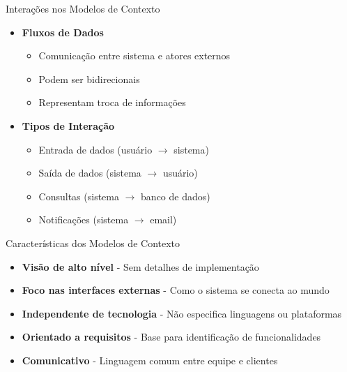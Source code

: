 \documentclass[aspectratio=169]{beamer}
\begin{document}
\begin{frame}{Interações nos Modelos de Contexto}
\begin{itemize}
\item \textbf{Fluxos de Dados}
\begin{itemize}
\item Comunicação entre sistema e atores externos
\item Podem ser bidirecionais
\item Representam troca de informações
\end{itemize}

\item \textbf{Tipos de Interação}
\begin{itemize}
\item Entrada de dados (usuário $\rightarrow$ sistema)
\item Saída de dados (sistema $\rightarrow$ usuário)
\item Consultas (sistema $\rightarrow$ banco de dados)
\item Notificações (sistema $\rightarrow$ email)
\end{itemize}
\end{itemize}
\end{frame}

\begin{frame}{Características dos Modelos de Contexto}
\begin{itemize}
\item \textbf{Visão de alto nível} - Sem detalhes de implementação
\item \textbf{Foco nas interfaces externas} - Como o sistema se conecta ao mundo
\item \textbf{Independente de tecnologia} - Não especifica linguagens ou plataformas
\item \textbf{Orientado a requisitos} - Base para identificação de funcionalidades
\item \textbf{Comunicativo} - Linguagem comum entre equipe e clientes
\end{itemize}
\end{frame}
\end{document}
